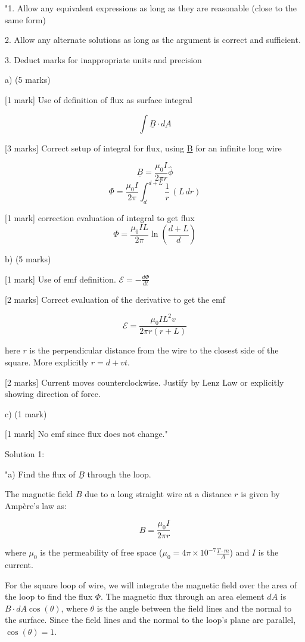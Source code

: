 "1. Allow any equivalent expressions as long as they are reasonable (close to the same form)

2. Allow any alternate solutions as long as the argument is correct and sufficient. 

3. Deduct marks for inappropriate units and precision

a) (5 marks)

[1 mark] Use of definition of flux as surface integral

\[ \int \underline{B} \cdot \underline{dA} \]

[3 marks] Correct setup of integral for flux, using \underline{B} for an infinite long wire 
 
\[ \underline{B} = \frac{\mu_0 I}{2\pi r} \hat{\phi} \]
\[ \Phi = \frac{\mu_0 I}{2\pi} \int_{d}^{d+L} \frac{1}{r} \, (L \, dr) \]

[1 mark] correction evaluation of integral to get flux
\[ \Phi = \frac{\mu_0 I L}{2\pi}\ln\left ( \frac{d+L}{d} \right ) \]

b) (5 marks)

[1 mark] Use of emf definition.  \( \mathcal{E} = - \frac{d\Phi}{dt} \)

[2 marks] Correct evaluation of the derivative to get the emf

\[ \mathcal{E} = \frac{\mu_0 I L^2 v}{2\pi r (r+L)} \]

here \( r \) is the perpendicular distance from the wire to the closest side of the square. More explicitly \( r = d + vt \).

[2 marks] Current moves counterclockwise. Justify by Lenz Law or explicitly showing direction of force.

c) (1 mark)

[1 mark] No emf since flux does not change."

Solution 1: 

"a) Find the flux of \( \underline{B} \) through the loop.

The magnetic field \( B \) due to a long straight wire at a distance \( r \) is given by Ampère's law as:

\[
B = \frac{\mu_0 I}{2 \pi r}
\]

where \( \mu_0 \) is the permeability of free space (\( \mu_0 = 4\pi \times 10^{-7} \frac{T \cdot m}{A} \)) and \( I \) is the current.

For the square loop of wire, we will integrate the magnetic field over the area of the loop to find the flux \( \Phi \). The magnetic flux through an area element \( dA \) is \( B \cdot dA \cos(\theta) \), where \( \theta \) is the angle between the field lines and the normal to the surface. Since the field lines and the normal to the loop's plane are parallel, \( \cos(\theta) = 1 \).

